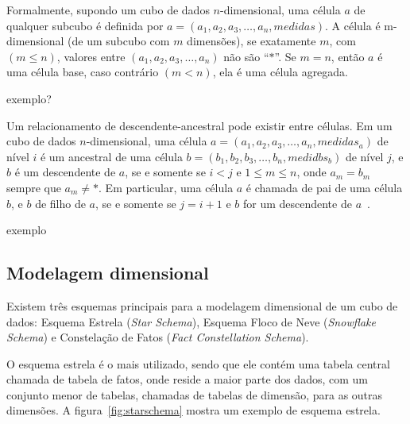 Formalmente, supondo um cubo de dados $n$-dimensional, uma célula $a$ de qualquer subcubo é definida por $a = (a_1, a_2, a_3, \ldots, a_n, medidas)$.
A célula é m-dimensional (de um subcubo com $m$ dimensões), se exatamente $m$, com $(m \leq n)$, valores entre $(a_1, a_2, a_3, \ldots, a_n)$ não são ``$*$''.
Se $m = n$, então $a$ é uma célula base, caso contrário $(m < n)$, ela é uma célula agregada.

{\color{red} exemplo?}

Um relacionamento de descendente-ancestral pode existir entre células.
Em um cubo de dados $n$-dimensional, uma célula $a = (a_1, a_2, a_3, \ldots, a_n, medidas_a)$ de nível $i$ é um ancestral de uma célula $b = (b_1, b_2, b_3, \ldots, b_n, medidbs_b)$ de nível $j$, e $b$ é um descendente de $a$, se e somente se $i < j$ e $1 \leq m \leq n$, onde $a_m = b_m$ sempre que $a_m \neq *$.
Em particular, uma célula $a$ é chamada de pai de uma célula $b$, e $b$ de filho de $a$, se e somente se $j = i+1$ e $b$ for um descendente de $a$~\cite{hanDataMiningConcepts2011}.

{\color{red} exemplo}

\subsection{Modelagem dimensional}\label{ch:fun:cube:dimm}

Existem três esquemas principais para a modelagem dimensional de um cubo de dados: Esquema Estrela (\textit{Star Schema}), Esquema Floco de Neve (\textit{Snowflake Schema}) e Constelação de Fatos (\textit{Fact Constellation Schema}).

O esquema estrela é o mais utilizado, sendo que ele contém uma tabela central chamada de tabela de fatos, onde reside a maior parte dos dados, com um conjunto menor de tabelas, chamadas de tabelas de dimensão, para as outras dimensões.
A figura~\ref{fig:starschema} mostra um exemplo de esquema estrela.

